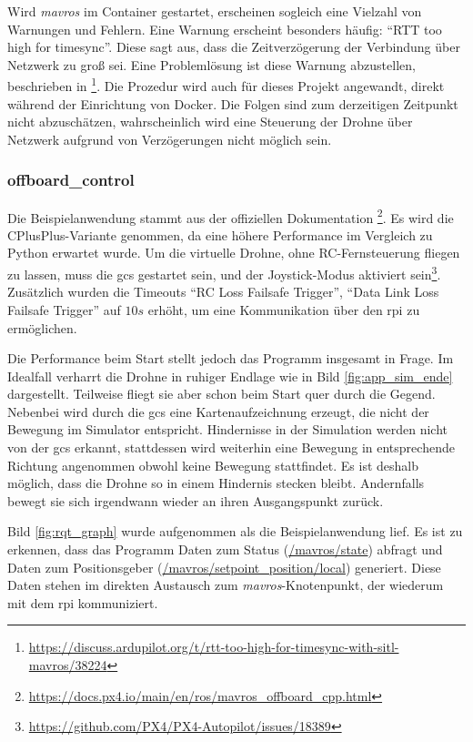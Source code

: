 Wird \textit{mavros} im Container gestartet, erscheinen sogleich eine Vielzahl von Warnungen und Fehlern. Eine Warnung erscheint besonders häufig: \enquote{RTT too high for timesync}. Diese sagt aus, dass die Zeitverzögerung der Verbindung über Netzwerk zu groß sei. Eine Problemlösung ist diese Warnung abzustellen, beschrieben in \footnote{\url{https://discuss.ardupilot.org/t/rtt-too-high-for-timesync-with-sitl-mavros/38224}}. Die Prozedur wird auch für dieses Projekt angewandt, direkt während der Einrichtung von Docker. Die Folgen sind zum derzeitigen Zeitpunkt nicht abzuschätzen, wahrscheinlich wird eine Steuerung der Drohne über Netzwerk aufgrund von Verzögerungen nicht möglich sein.

\subsubsection{offboard\_control}
Die Beispielanwendung stammt aus der offiziellen Dokumentation \footnote{\url{https://docs.px4.io/main/en/ros/mavros_offboard_cpp.html}\cite{dronecodestiftungPX4UserGuide}}. Es wird die CPlusPlus-Variante genommen, da eine höhere Performance im Vergleich zu Python erwartet wurde. Um die virtuelle Drohne, ohne RC-Fernsteuerung fliegen zu lassen, muss die \gls{gcs} gestartet sein, und der Joystick-Modus aktiviert sein\footnote{\url{https://github.com/PX4/PX4-Autopilot/issues/18389}\cite{dronecodestiftungPX4UserGuide}}. Zusätzlich wurden die Timeouts \enquote{RC Loss Failsafe Trigger}, \enquote{Data Link Loss Failsafe Trigger} auf $10s$ erhöht, um eine Kommunikation über den \gls{rpi} zu ermöglichen.

Die Performance beim Start stellt jedoch das Programm insgesamt in Frage. Im Idealfall verharrt die Drohne in ruhiger Endlage wie in Bild \ref{fig:app_sim_ende} dargestellt. Teilweise fliegt sie aber schon beim Start quer durch die Gegend. Nebenbei wird durch die \gls{gcs} eine Kartenaufzeichnung erzeugt, die nicht der Bewegung im Simulator entspricht. Hindernisse in der Simulation werden nicht von der \gls{gcs} erkannt, stattdessen wird weiterhin eine Bewegung in entsprechende Richtung angenommen obwohl keine Bewegung stattfindet. Es ist deshalb möglich, dass die Drohne so in einem Hindernis stecken bleibt. Andernfalls bewegt sie sich irgendwann wieder an ihren Ausgangspunkt zurück.

Bild \ref{fig:rqt_graph} wurde aufgenommen als die Beispielanwendung lief. Es ist zu erkennen, dass das Programm Daten zum Status (\url{/mavros/state}) abfragt und Daten zum Positionsgeber (\url{/mavros/setpoint_position/local}) generiert. Diese Daten stehen im direkten Austausch zum \textit{mavros}-Knotenpunkt, der wiederum mit dem \gls{rpi} kommuniziert.

